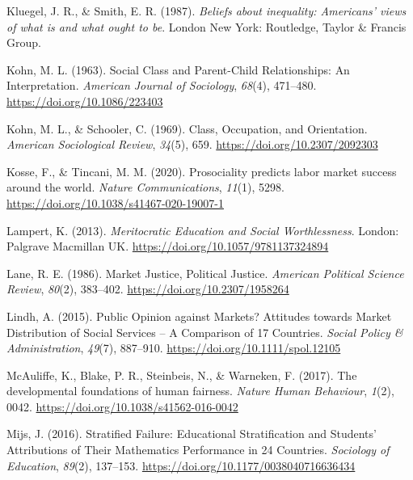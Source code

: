 \documentclass[
  letterpaper,
  DIV=11,
  numbers=noendperiod]{scrartcl}
\newlength{\cslhangindent}
\newlength{\cslentryspacingunit} %
\newenvironment{CSLReferences}[2] %
 {%
  \setlength{\parindent}{0pt}
  \ifodd #1
  \let\oldpar\par
  \def\par{\hangindent=\cslhangindent\oldpar}
  \fi
  \setlength{\parskip}{#2\cslentryspacingunit}
 }%
 {}
\begin{document}
\begin{CSLReferences}{1}{0}
\leavevmode{}%
Kluegel, J. R., \& Smith, E. R. (1987). \emph{Beliefs about inequality:
{Americans}' views of what is and what ought to be}. London New York:
Routledge, Taylor \& Francis Group.

\leavevmode{}%
Kohn, M. L. (1963). Social {Class} and {Parent-Child Relationships}: {An
Interpretation}. \emph{American Journal of Sociology}, \emph{68}(4),
471--480. \url{https://doi.org/10.1086/223403}

\leavevmode{}%
Kohn, M. L., \& Schooler, C. (1969). Class, {Occupation}, and
{Orientation}. \emph{American Sociological Review}, \emph{34}(5), 659.
\url{https://doi.org/10.2307/2092303}

\leavevmode{}%
Kosse, F., \& Tincani, M. M. (2020). Prosociality predicts labor market
success around the world. \emph{Nature Communications}, \emph{11}(1),
5298. \url{https://doi.org/10.1038/s41467-020-19007-1}

\leavevmode{}%
Lampert, K. (2013). \emph{Meritocratic {Education} and {Social
Worthlessness}}. London: Palgrave Macmillan UK.
\url{https://doi.org/10.1057/9781137324894}

\leavevmode{}%
Lane, R. E. (1986). Market {Justice}, {Political Justice}.
\emph{American Political Science Review}, \emph{80}(2), 383--402.
\url{https://doi.org/10.2307/1958264}

\leavevmode{}%
Lindh, A. (2015). Public {Opinion} against {Markets}? {Attitudes}
towards {Market Distribution} of {Social Services} -- {A Comparison} of
17 {Countries}. \emph{Social Policy \& Administration}, \emph{49}(7),
887--910. \url{https://doi.org/10.1111/spol.12105}

\leavevmode{}%
McAuliffe, K., Blake, P. R., Steinbeis, N., \& Warneken, F. (2017). The
developmental foundations of human fairness. \emph{Nature Human
Behaviour}, \emph{1}(2), 0042.
\url{https://doi.org/10.1038/s41562-016-0042}

\leavevmode{}%
Mijs, J. (2016). Stratified {Failure}: {Educational Stratification} and
{Students}' {Attributions} of {Their Mathematics Performance} in 24
{Countries}. \emph{Sociology of Education}, \emph{89}(2), 137--153.
\url{https://doi.org/10.1177/0038040716636434}


\end{CSLReferences}
\end{document}
